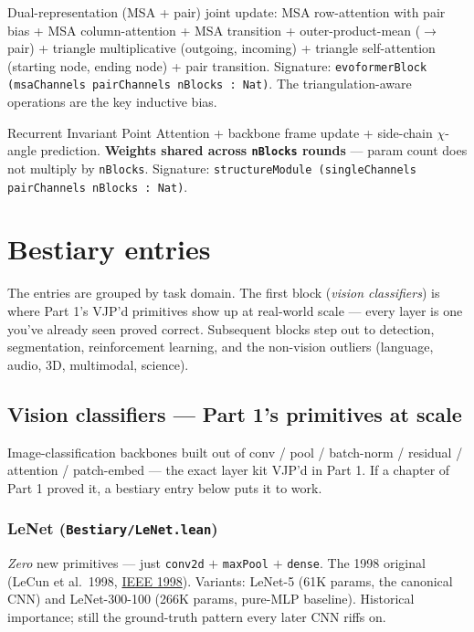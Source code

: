 \begin{definition}
  \label{layer:evoformerBlock}
  \leanok
  Dual-representation (MSA + pair) joint update: MSA row-attention with
  pair bias + MSA column-attention + MSA transition +
  outer-product-mean ($\to$ pair) + triangle multiplicative (outgoing,
  incoming) + triangle self-attention (starting node, ending node) +
  pair transition. Signature:
  \texttt{evoformerBlock (msaChannels pairChannels nBlocks : Nat)}.
  The triangulation-aware operations are the key inductive bias.
\end{definition}

\begin{definition}
  \label{layer:structureModule}
  \leanok
  Recurrent Invariant Point Attention + backbone frame update +
  side-chain $\chi$-angle prediction. \textbf{Weights shared across
  \texttt{nBlocks} rounds} --- param count does not multiply by
  \texttt{nBlocks}. Signature:
  \texttt{structureModule (singleChannels pairChannels nBlocks : Nat)}.
\end{definition}

\section{Bestiary entries}
\label{sec:bestiary_entries}

The entries are grouped by task domain. The first block (\emph{vision
classifiers}) is where Part 1's VJP'd primitives show up at real-world
scale --- every layer is one you've already seen proved correct.
Subsequent blocks step out to detection, segmentation, reinforcement
learning, and the non-vision outliers (language, audio, 3D,
multimodal, science).

\subsection{Vision classifiers --- Part 1's primitives at scale}

Image-classification backbones built out of conv / pool / batch-norm /
residual / attention / patch-embed --- the exact layer kit VJP'd in
Part 1. If a chapter of Part 1 proved it, a bestiary entry below puts
it to work.

\subsubsection*{LeNet (\texttt{Bestiary/LeNet.lean})}
\emph{Zero} new primitives --- just \texttt{conv2d} $+$ \texttt{maxPool}
$+$ \texttt{dense}. The 1998 original (LeCun et al.\ 1998,
\href{http://yann.lecun.com/exdb/publis/pdf/lecun-98.pdf}{IEEE 1998}).
Variants: LeNet-5 (61K params,
the canonical CNN) and LeNet-300-100 (266K params, pure-MLP baseline).
Historical importance; still the ground-truth pattern every later CNN
riffs on.


